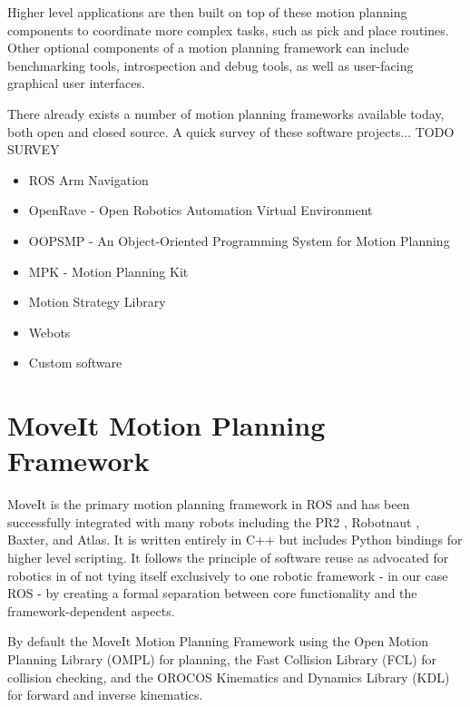 \documentclass[10pt,journal,compsoc]{joser1}
\begin{document}
{Higher level applications are then built on top of these motion planning components to coordinate more complex tasks, such as pick and place routines. Other optional components of a motion planning framework can include benchmarking tools, introspection and debug tools, as well as user-facing graphical user interfaces. 

There already exists a number of motion planning frameworks available today, both open and closed source. A quick survey of these software projects... TODO SURVEY

\begin{itemize}
    \item ROS Arm Navigation
    \item OpenRave - Open Robotics Automation Virtual Environment
    \item OOPSMP - An Object-Oriented Programming System for Motion Planning
    \item MPK - Motion Planning Kit
    \item Motion Strategy Library
    \item Webots
    \item Custom software
\end{itemize}

\section{MoveIt Motion Planning Framework}
\label{sec::moveit}

MoveIt is the primary motion planning framework in ROS and has been successfully integrated with many robots including the PR2 \cite{wyrobek2008towards}, Robotnaut \cite{ambrose2000robonaut}, Baxter, and Atlas. It is written entirely in C++ but includes Python bindings for higher level scripting. It follows the principle of software reuse as advocated for robotics in \cite{makarenko2007benefits} of not tying itself exclusively to one robotic framework - in our case ROS - by creating a formal separation between core functionality and the framework-dependent aspects. 

By default the MoveIt Motion Planning Framework using the Open Motion Planning Library (OMPL) \cite{sucan2012the-open-motion-planning-library} for planning, the Fast Collision Library (FCL) \cite{fcl} for collision checking, and the OROCOS Kinematics and Dynamics Library (KDL) \cite{kdl} for forward and inverse kinematics. 

}
\end{document}
